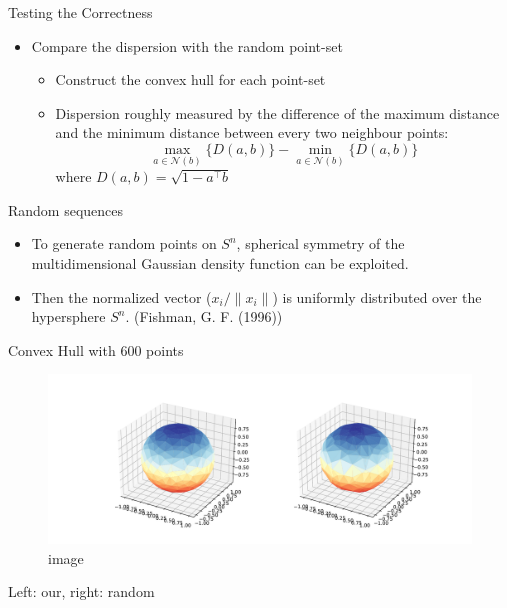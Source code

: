 \documentclass[10pt,ignorenonframetext,serif,onlymath]{beamer}
\begin{document}
\begin{frame}{Testing the Correctness}
\protect\hypertarget{testing-the-correctness}{}

\begin{itemize}
\item
  Compare the dispersion with the random point-set

  \begin{itemize}
  \item
    Construct the convex hull for each point-set
  \item
    Dispersion roughly measured by the difference of the maximum
    distance and the minimum distance between every two neighbour
    points: \[\max_{a \in \mathcal{N}(b)} \{D(a,b)\} - 
            \min_{a \in \mathcal{N}(b)} \{ D(a, b) \}\] where
    \(D(a,b) = \sqrt{1 - a^\top b}\)
  \end{itemize}
\end{itemize}

\end{frame}

\begin{frame}{Random sequences}
\protect\hypertarget{random-sequences}{}

\begin{itemize}
\item
  To generate random points on \(S^n\), spherical symmetry of the
  multidimensional Gaussian density function can be exploited.
\item
  Then the normalized vector (\(x_i/\|x_i\|\)) is uniformly distributed
  over the hypersphere \(S^n\). (Fishman, G. F. (1996))
\end{itemize}

\end{frame}

\begin{frame}{Convex Hull with \(600\) points}
\protect\hypertarget{convex-hull-with-600-points}{}

\begin{figure}
\centering
\includegraphics{res_compare.pdf}
\caption{image}
\end{figure}

Left: our, right: random

\end{frame}
\end{document}
